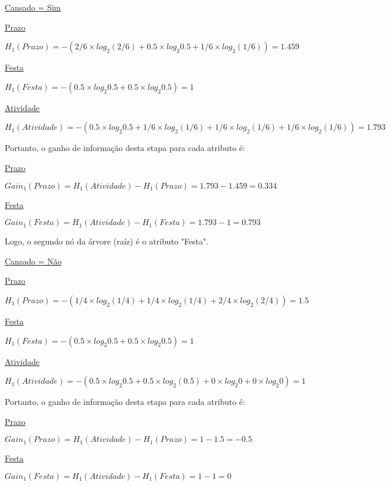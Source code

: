 \documentclass{article}
\begin{document}
\bigskip
\quad \underline{Cansado = Sim}

\bigskip
\qquad \underline{Prazo}

\qquad $H_{1}(Prazo) = -(2/6 \times log_{2}(2/6) + 0.5 \times log_{2}0.5 + 1/6 \times log_{2}(1/6)) = 1.459$

\bigskip
\qquad \underline{Festa}

\qquad $H_{1}(Festa) = -(0.5 \times log_{2}0.5 + 0.5 \times log_{2}0.5) = 1$


\bigskip
\qquad \underline{Atividade}

\qquad $H_{1}(Atividade) = -(0.5 \times log_{2}0.5 + 1/6 \times log_{2}(1/6) + 1/6 \times log_{2}(1/6) + 1/6 \times log_{2}(1/6)) = 1.793$

\bigskip
\qquad Portanto, o ganho de informação desta etapa para cada atributo é:

\bigskip
\qquad \underline{Prazo}

\quad \qquad $Gain_{1}(Prazo) = H_{1}(Atividade) - H_{1}(Prazo) = 1.793 - 1.459 = 0.334$

\qquad \underline{Festa}

\quad \qquad $Gain_{1}(Festa) = H_{1}(Atividade) - H_{1}(Festa) = 1.793 - 1 = 0.793$

\bigskip
\qquad Logo, o segundo nó da árvore (raíz) é o atributo "Festa".

\bigskip
\quad \underline{Cansado = Não}

\bigskip
\qquad \underline{Prazo}

\qquad $H_{1}(Prazo) = -(1/4 \times log_{2}(1/4) + 1/4 \times log_{2}(1/4) + 2/4 \times log_{2}(2/4)) = 1.5$

\bigskip
\qquad \underline{Festa}

\qquad $H_{1}(Festa) = -(0.5 \times log_{2}0.5 + 0.5 \times log_{2}0.5) = 1$

\bigskip
\qquad \underline{Atividade}

\qquad $H_{1}(Atividade) = -(0.5 \times log_{2}0.5 + 0.5 \times log_{2}(0.5) + 0 \times log_{2}0 + 0 \times log_{2}0) = 1$

\bigskip
\qquad Portanto, o ganho de informação desta etapa para cada atributo é:

\bigskip
\qquad \underline{Prazo}

\quad \qquad $Gain_{1}(Prazo) = H_{1}(Atividade) - H_{1}(Prazo) = 1 - 1.5 = -0.5$

\qquad \underline{Festa}

\quad \qquad $Gain_{1}(Festa) = H_{1}(Atividade) - H_{1}(Festa) = 1 - 1 = 0$
\end{document}
